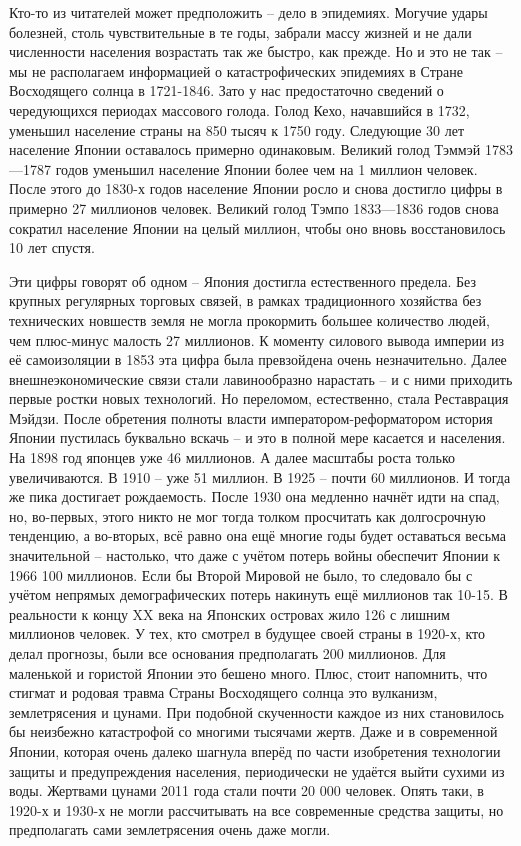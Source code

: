 Кто-то из читателей может предположить – дело в эпидемиях. Могучие удары болезней, столь чувствительные в те годы, забрали массу жизней и не дали численности населения возрастать так же быстро, как прежде. Но и это не так – мы не располагаем информацией о катастрофических эпидемиях в Стране Восходящего солнца в 1721-1846. Зато у нас предостаточно сведений о чередующихся периодах массового голода. Голод Кехо, начавшийся в 1732, уменьшил население страны на 850 тысяч к 1750 году. Следующие 30 лет население Японии оставалось примерно одинаковым. Великий голод Тэммэй 1783—1787 годов уменьшил население Японии более чем на 1 миллион человек. После этого до 1830-х годов население Японии росло и снова достигло цифры в примерно 27 миллионов человек. Великий голод Тэмпо 1833—1836 годов снова сократил население Японии на целый миллион, чтобы оно вновь восстановилось 10 лет спустя.

Эти цифры говорят об одном – Япония достигла естественного предела. Без крупных регулярных торговых связей, в рамках традиционного хозяйства без технических новшеств земля не могла прокормить большее количество людей, чем плюс-минус малость 27 миллионов. К моменту силового вывода империи из её самоизоляции в 1853 эта цифра была превзойдена очень незначительно. Далее внешнеэкономические связи стали лавинообразно нарастать – и с ними приходить первые ростки новых технологий. Но переломом, естественно, стала Реставрация Мэйдзи. После обретения полноты власти императором-реформатором история Японии пустилась буквально вскачь – и это в полной мере касается и населения. На 1898 год японцев уже 46 миллионов. А далее масштабы роста только увеличиваются. В 1910 – уже 51 миллион. В 1925 – почти 60 миллионов. И тогда же пика достигает рождаемость. После 1930 она медленно начнёт идти на спад, но, во-первых, этого никто не мог тогда толком просчитать как долгосрочную тенденцию, а во-вторых, всё равно она ещё многие годы будет оставаться весьма значительной – настолько, что даже с учётом потерь войны обеспечит Японии к 1966 100 миллионов. Если бы Второй Мировой не было, то следовало бы с учётом непрямых демографических потерь накинуть ещё миллионов так 10-15. В реальности к концу XX века на Японских островах жило 126 с лишним миллионов человек. У тех, кто смотрел в будущее своей страны в 1920-х, кто делал прогнозы, были все основания предполагать 200 миллионов. Для маленькой и гористой Японии это бешено много. Плюс, стоит напомнить, что стигмат и родовая травма Страны Восходящего солнца это вулканизм, землетрясения и цунами. При подобной скученности каждое из них становилось бы неизбежно катастрофой со многими тысячами жертв. Даже и в современной Японии, которая очень далеко шагнула вперёд по части изобретения технологии защиты и предупреждения населения, периодически не удаётся выйти сухими из воды. Жертвами цунами 2011 года стали почти 20 000 человек. Опять таки, в 1920-х и 1930-х не могли рассчитывать на все современные средства защиты, но предполагать сами землетрясения очень даже могли.


